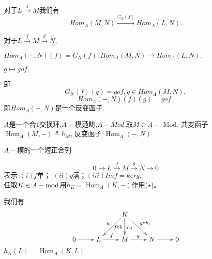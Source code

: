 \documentclass[UTF8]{article}
\begin{document}
对于$L\xrightarrow{f}M$我们有
$$Hom_{A}(M,N)\xrightarrow{G_{N}(f)}Hom_{A}(L,N).$$

对于$L\xrightarrow{f}M\xrightarrow{g}N,$

$Hom_{A}(-,N)(f)=G_{N}(f):$\quad$Hom_{A}(M,N)\longrightarrow Hom_{A}(L,N),$

\qquad\qquad\qquad\qquad\qquad\qquad\qquad\qquad\qquad\quad$g\longmapsto gof,$

即
$$G_{N}(f)(g)=gof,g\in Hom_{A}(M,N),$$
$$Hom_{A}(-,N)(f)(g)=gof,$$即$Hom_{A}(-,N)$是一个反变函子.




$A$是一个合$1$交换环,$A-$模范畴,$A-Mod.$取$M \in A-$ Mod.
共变函子 $\operatorname{Hom}_{A}(M,-) \triangleq h_{M}$,
反变函子  $\operatorname{Hom}_{A}(-,N)$

$A-$模的一个短正合列

\begin{equation}
0 \stackrel{}{\longrightarrow} L \stackrel{f}{\longrightarrow} M \stackrel{g}{\longrightarrow} N
\stackrel{}{\longrightarrow} 0\tag{$\star$}
\end{equation}
表示 $(i)f$单； $(ii)g$满；$(iii)Imf=kerg$.\\
任取$K \in A-\bmod$用$h_{K}=\operatorname{Hom}_{A}\left(K,-\right)$作用($\star$)。

我们有
$$
\xymatrix{
	& & K\ar[ld]_{h}\ar[d]^{h_{1}}_{f\circ h}\ar[rd]^{g\circ h_{1}}  & &\\
	0\ar[r]&L\ar[r]^{f}&M\ar[r]^{g}&N\ar[r]&0
}
$$
$h_{K}(L)=\operatorname{Hom}_{A}\left(K, L\right)$
\end{document}
